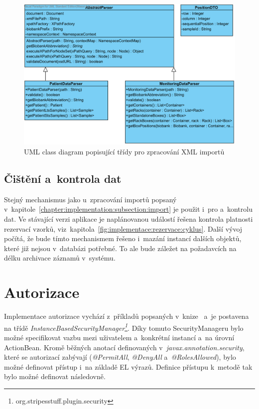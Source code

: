 \documentclass[11pt, draft, oneside]{fithesis2}
\begin{document}
\begin{figure}[h!]
\begin{center}
	\includegraphics[width=\textwidth]{ParserView}
\caption{UML class diagram popisující třídy pro zpracování XML importů}
\label{fig:index:uml:class:parser}
\end{center}
\end{figure}

\subsection{Čištění a~kontrola dat}
Stejný mechanismus jako u~zpracování importů popsaný v~kapitole~\ref{chapter:implementation:subsection:import} je použit i~pro  a~kontrolu dat. Ve stávající verzi aplikace je naplánovanou událostí řešena kontrola platnosti rezervací vzorků, viz~kapitola~\ref{fig:implementace:rezervace:cyklus}. 
Další vývoj počítá, že bude tímto mechanismem řešeno i~mazání instancí dalších objektů, které již nejsou v~databázi potřebné. To ale bude záležet na požadavcích na délku archivace záznamů v~systému.

\section{Autorizace}
Implementace autorizace vychází z~příkladů popsaných v~knize~\cite{Stripes} a~je postavena na třídě \textit{InstanceBasedSecurityManager\footnote{org.stripesstuff.plugin.security}}. Díky tomuto SecurityManageru bylo možné specifikovat vazbu mezi uživatelem a~konkrétní instancí a~na úrovní ActionBean. Kromě běžných anotací definovaných v~\textit{javax.annotation.security}, které se autorizací zabývají (\textit{@PermitAll}, \textit{@DenyAll} a~\textit{@RolesAllowed}), bylo možné definovat přístup i~na základě EL výrazů. Definice přístupu k~metodě tak bylo možné definovat následovně.
\end{document}
